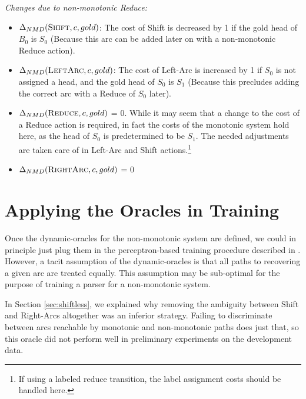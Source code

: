 \documentclass[11pt,letterpaper]{article}
\begin{document}
\noindent \emph{Changes due to non-monotonic Reduce:}
\begin{itemize}\addtolength{\itemsep}{-0.5\baselineskip}

   \item $\Delta_{NMD}(\textsc{Shift},c,gold)$: The cost of Shift is decreased
      by 1 if the gold head of $B_0$ is $S_0$ (Because this arc can be added
      later on with a non-monotonic Reduce action).

   \item $\Delta_{NMD}(\textsc{LeftArc},c,gold)$: The cost of Left-Arc is
      increased by 1 if $S_0$ is not assigned a head, and the gold head of
      $S_0$ is $S_{1}$ (Because this precludes adding the correct arc
      with a Reduce of $S_0$ later).

   \item $\Delta_{NMD}(\textsc{Reduce},c,gold)$ = 0. While it may seem that a
      change to the cost of a Reduce action is required, in fact the costs of
      the monotonic system hold here, as the head of $S_0$ is predetermined to
      be $S_1$.  The needed adjustments are taken care of
      in Left-Arc and Shift actions.\footnote{If using a labeled reduce transition,
      the label assignment costs should be handled here.}

   \item $\Delta_{NMD}(\textsc{RightArc},c,gold)$ = 0
\end{itemize}

\section{Applying the Oracles in Training}

Once the dynamic-oracles for the non-monotonic system are defined, we could in
principle just plug them in the perceptron-based training procedure described
in \citet{goldberg:12}.
However, a tacit assumption of the dynamic-oracles is that all paths to
recovering a given arc are treated equally. This assumption may be sub-optimal
for the purpose of training a parser for a non-monotonic system.

In Section \ref{sec:shiftless}, we explained why removing the ambiguity between
Shift and Right-Arcs altogether was an inferior strategy. Failing to discriminate
between arcs reachable by monotonic and non-monotonic paths does just that,
so this oracle did not perform well in preliminary experiments on the development
data.
\end{document}

